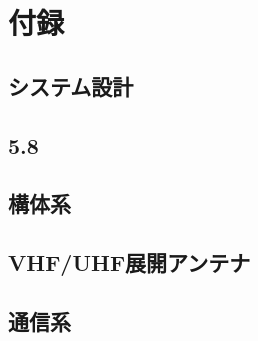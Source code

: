 \chapter{付録}
\label{chap:appendix}

%

\section{システム設計}

\section{5.8}

\section{構体系}

\section{VHF/UHF展開アンテナ}

\section{通信系}

